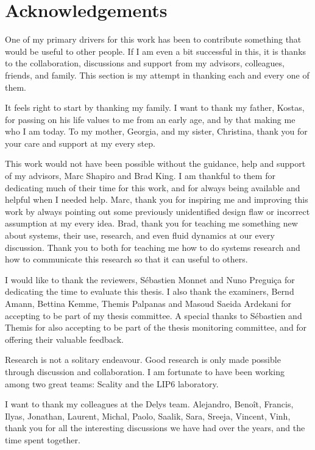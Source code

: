 \chapter*{Acknowledgements}

One of my primary drivers for this work has been to contribute something that would be useful to other people.
If I am even a bit successful in this, it is thanks to the collaboration, discussions and support from my
advisors, colleagues, friends, and family.
This section is my attempt in thanking each and every one of them.

\small
It feels right to start by thanking my family. I want to thank my father, Kostas, for passing on his life values to me from an early age,
and by that making me who I am today.
To my mother, Georgia, and my sister, Christina, thank you for your care and support at my every step.

\bigskip
This work would not have been possible without the guidance, help and support of my advisors, Marc Shapiro and Brad King.
I am thankful to them for dedicating much of their time for this work,
and for always being available and helpful when I needed help.
Marc, thank you for inspiring me and improving this work by always pointing out some previously unidentified
design flaw or incorrect assumption at my every idea.
Brad, thank you for teaching me something new about systems, their use, research, and even fluid dynamics at our every
discussion.
Thank you to both for teaching me how to do systems research and how to communicate this research so that it can useful
to others.

\bigskip
I would like to thank the reviewers, S{\'e}bastien Monnet and Nuno Pregui\c{c}a for dedicating the time
to evaluate this thesis.
I also thank the examiners, Bernd Amann, Bettina Kemme, Themis Palpanas and Masoud Saeida Ardekani for accepting to be
part of my thesis committee.
A special thanks to S{\'e}bastien and Themis for also accepting to be part of the thesis monitoring committee,
and for offering their valuable feedback.

\bigskip
Research is not a solitary endeavour.
Good research is only made possible through discussion and collaboration.
I am fortunate to have been working among two great teams: Scality and the LIP6 laboratory.

I want to thank my colleagues at the Delys team.
Alejandro, Beno\^it, Francis, Ilyas, Jonathan, Laurent, Michal, Paolo, Saalik, Sara, Sreeja, Vincent, Vinh, thank you
for all the interesting discussions we have had over the years, and the time spent together.

